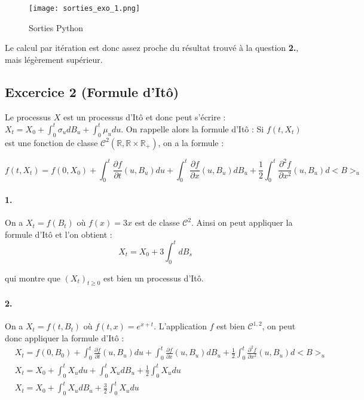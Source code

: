 \documentclass[a4paper,10pt]{report}
\begin{document}
\begin{figure}[h!]
\centering
\texttt{[image: sorties\_exo\_1.png]}
\caption{Sorties Python}
\end{figure}

Le calcul par itération est donc assez proche du résultat trouvé à la question \textbf{2.}, mais légèrement supérieur.

\newpage

\subsection*{Excercice 2 (Formule d’Itô)}

Le processus $X$ est un processus d'Itô et donc peut s'écrire : $X_{t}=X_{0}+\int_{0}^{t} \sigma_{u} d B_{u}+\int_{0}^{t} \mu_{u} d u$. On rappelle alors la formule d'Itô :  Si $f(t,X_t)$ est une fonction de classe ${\mathcal{C}}^{{2}}({{\mathbb  {R}}, \mathbb  {R}}\times {\mathbb  {R}}_{+})$, on a la formule :

$$
\boxed{
f(t,X_t) = f(0,X_0) + \int_0^t \frac{\partial f}{\partial t} (u, B_u) du +  \int_0^t \frac{\partial f}{\partial x} (u,B_u)dB_u + \frac{1}{2}  \int_0^t \frac{\partial^2 f}{\partial x^2} (u,B_u) d<B>_u
}
$$


\paragraph{1.}  On a $X_t = f(B_t)$ où $f(x) = 3x$ est de classe $\mathcal{C}^2$. Ainsi on peut appliquer la formule d'Itô et l'on obtient :
$$
X_t = X_0 + 3 \int_0^t dB_s 
$$

qui montre que $(X_t)_{t \geq 0}$ est bien un processus d'Itô.


\paragraph{2.} On a $X_t = f(t, B_t)$ où $f(t,x) = e^{x + t}$. L'application $f$ est bien $\mathcal{C}^{1,2}$, on peut donc appliquer la formule d'Itô : 
$$
\begin{aligned}
& X_t = f(0,B_0) + \int_0^t \frac{\partial f}{\partial t} (u, B_u) du +  \int_0^t \frac{\partial f}{\partial x} (u,B_u)dB_u + \frac{1}{2}  \int_0^t \frac{\partial^2 f}{\partial x^2} (u,B_u) d<B>_u \\
& X_t = X_0 + \int_0^t  X_u du + \int_0^t  X_u dB_u + \frac{1}{2}  \int_0^t  X_u du \\
& X_t = X_0 + \int_0^t X_u dB_u + \frac{3}{2} \int_0^t  X_u du
\end{aligned}
$$
\end{document}
